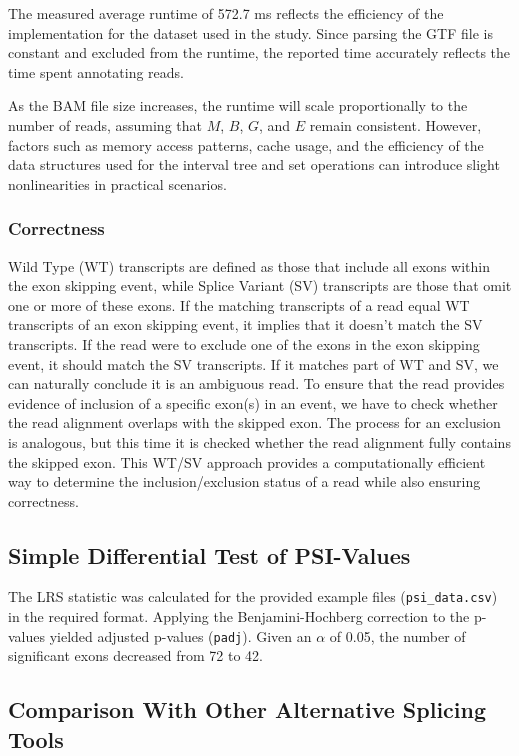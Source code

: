 \documentclass{article}
\begin{document}
    The measured average runtime of 572.7 ms reflects the efficiency of the implementation for the dataset used in the study. Since parsing the GTF file is constant and excluded from the runtime, the reported time accurately reflects the time spent annotating reads.

    As the BAM file size increases, the runtime will scale proportionally to the number of reads, assuming that \(M\), \(B\), \(G\), and \(E\) remain consistent. However, factors such as memory access patterns, cache usage, and the efficiency of the data structures used for the interval tree and set operations can introduce slight nonlinearities in practical scenarios.
    \subsubsection{Correctness}

    Wild Type (WT) transcripts are defined as those that include all exons within the exon skipping event, while Splice Variant (SV) transcripts are those that omit one or more of these exons. If the matching transcripts of a read equal WT transcripts of an exon skipping event, it implies that it doesn't match the SV transcripts. If the read were to exclude one of the exons in the exon skipping event, it should match the SV transcripts. If it matches part of WT and SV, we can naturally conclude it is an ambiguous read. To ensure that the read provides evidence of inclusion of a specific exon(s) in an event, we have to check whether the read alignment overlaps with the skipped exon. The process for an exclusion is analogous, but this time it is checked whether the read alignment fully contains the skipped exon. This WT/SV approach provides a computationally efficient way to determine the inclusion/exclusion status of a read while also ensuring correctness.

    \subsection{Simple Differential Test of PSI-Values}\label{subsec:simple-differential-test-of-psi-values-results}
    The LRS statistic was calculated for the provided example files (\texttt{psi\_data.csv}) in the required format. Applying the Benjamini-Hochberg correction to the p-values yielded adjusted p-values (\texttt{padj}). Given an $\alpha$ of 0.05, the number of significant exons decreased from 72 to 42.
    \subsection[Alternative Splicing Comparison]{Comparison With Other Alternative Splicing Tools}\label{subsec:comparison-with-other-alternative-splicing-tools-results}
\end{document}
